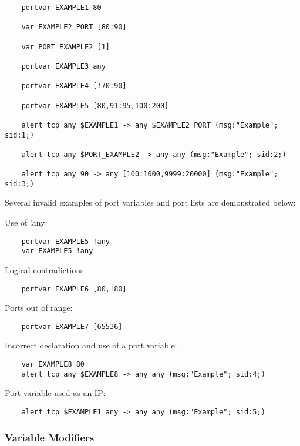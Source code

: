 \documentclass[english]{report}
\begin{document}
\begin{verbatim}     
    portvar EXAMPLE1 80

    var EXAMPLE2_PORT [80:90]

    var PORT_EXAMPLE2 [1]

    portvar EXAMPLE3 any

    portvar EXAMPLE4 [!70:90]

    portvar EXAMPLE5 [80,91:95,100:200]

    alert tcp any $EXAMPLE1 -> any $EXAMPLE2_PORT (msg:"Example"; sid:1;)

    alert tcp any $PORT_EXAMPLE2 -> any any (msg:"Example"; sid:2;)

    alert tcp any 90 -> any [100:1000,9999:20000] (msg:"Example"; sid:3;)
\end{verbatim}

Several invalid examples of port variables and port lists are demonstrated
below:

Use of !any:

\begin{verbatim}     
    portvar EXAMPLE5 !any
    var EXAMPLE5 !any
\end{verbatim}

Logical contradictions:

\begin{verbatim}     
    portvar EXAMPLE6 [80,!80]
\end{verbatim}

Ports out of range:

\begin{verbatim}     
    portvar EXAMPLE7 [65536]
\end{verbatim}

Incorrect declaration and use of a port variable:

\begin{verbatim}     
    var EXAMPLE8 80 
    alert tcp any $EXAMPLE8 -> any any (msg:"Example"; sid:4;)
\end{verbatim}

Port variable used as an IP:

\begin{verbatim}     
    alert tcp $EXAMPLE1 any -> any any (msg:"Example"; sid:5;)
\end{verbatim}

\subsubsection{Variable Modifiers}
\end{document}
